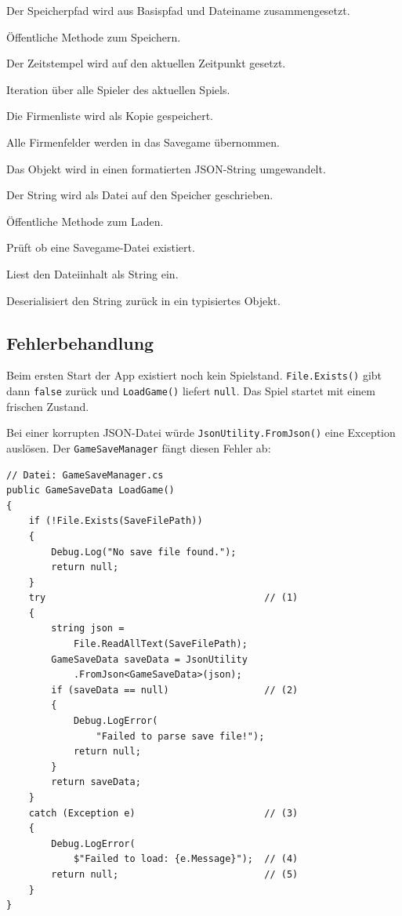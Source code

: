 \documentclass[12pt,a4paper]{article}
\begin{document}
\begin{description}[leftmargin=2em, labelwidth=1.5em]
    \item[(1)] Der Speicherpfad wird aus Basispfad und Dateiname zusammengesetzt.
    \item[(2)] Öffentliche Methode zum Speichern.
    \item[(3)] Der Zeitstempel wird auf den aktuellen Zeitpunkt gesetzt.
    \item[(4)] Iteration über alle Spieler des aktuellen Spiels.
    \item[(5)] Die Firmenliste wird als Kopie gespeichert.
    \item[(6)] Alle Firmenfelder werden in das Savegame übernommen.
    \item[(7)] Das Objekt wird in einen formatierten JSON-String umgewandelt.
    \item[(8)] Der String wird als Datei auf den Speicher geschrieben.
    \item[(9)] Öffentliche Methode zum Laden.
    \item[(10)] Prüft ob eine Savegame-Datei existiert.
    \item[(11)] Liest den Dateiinhalt als String ein.
    \item[(12)] Deserialisiert den String zurück in ein typisiertes Objekt.
\end{description}

\subsection{Fehlerbehandlung}

Beim ersten Start der App existiert noch kein Spielstand. \texttt{File.Exists()} gibt dann \texttt{false} zurück und \texttt{LoadGame()} liefert \texttt{null}. Das Spiel startet mit einem frischen Zustand.

Bei einer korrupten JSON-Datei würde \texttt{JsonUtility.FromJson()} eine Exception auslösen. Der \texttt{GameSaveManager} fängt diesen Fehler ab:

\begin{lstlisting}
// Datei: GameSaveManager.cs
public GameSaveData LoadGame()
{
    if (!File.Exists(SaveFilePath))
    {
        Debug.Log("No save file found.");
        return null;
    }
    try                                       // (1)
    {
        string json =
            File.ReadAllText(SaveFilePath);
        GameSaveData saveData = JsonUtility
            .FromJson<GameSaveData>(json);
        if (saveData == null)                 // (2)
        {
            Debug.LogError(
                "Failed to parse save file!");
            return null;
        }
        return saveData;
    }
    catch (Exception e)                       // (3)
    {
        Debug.LogError(
            $"Failed to load: {e.Message}");  // (4)
        return null;                          // (5)
    }
}
\end{lstlisting}
\end{document}
